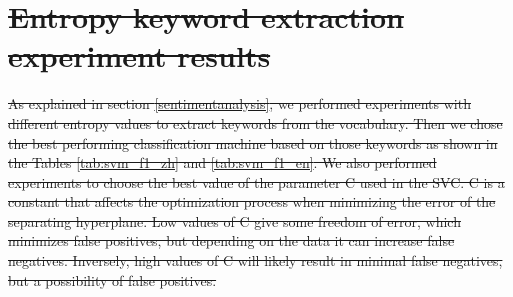 \documentclass[smallextended,natbib]{svjour3}       %
\providecommand{\DIFdel}[1]{{\protect\color{red}\sout{#1}}}                      %
\begin{document}

\section[]{\DIFdel{Entropy keyword extraction experiment results}}%
\addtocounter{section}{-1}%

\DIFdel{As explained in section \ref{sentimentanalysis}, we performed experiments with different entropy values to extract keywords from the vocabulary. Then we chose the best performing classification machine based on those keywords as shown in the Tables \ref{tab:svm_f1_zh} and \ref{tab:svm_f1_en}. We also performed experiments to choose the best value of the parameter C used in the SVC. C is a constant that affects the optimization process when minimizing the error of the separating hyperplane. Low values of C give some freedom of error, which minimizes false positives, but depending on the data it can increase false negatives. Inversely, high values of C will likely result in minimal false negatives, but a possibility of false positives. 
}%
\end{document}
